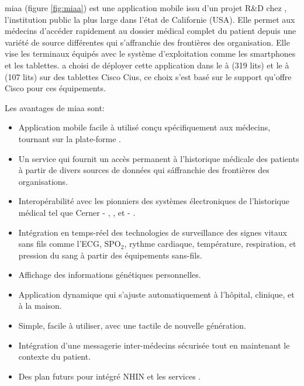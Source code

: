 \gls{miaa} (figure \ref{fig:miaa}) est une application mobile issu d'un
projet R\&D chez , l'institution public la
plus large dans l'état de Californie (USA). Elle permet aux médecins
d'accéder rapidement au dossier médical complet du patient depuis une
variété de source différentes qui s'affranchie des frontières des
organisation\cite{pph:eweek}. Elle vise les terminaux équipés avec le
système d'exploitation \android{} comme les smartphones et les
tablettes.  a choisi de déployer cette
application dans le  à  (319
lits) et le  à  (107 lits) sur des
tablettes Cisco Cius\cite{pph:tabtimes}, ce choix s'est basé sur le
support qu'offre Cisco pour ces équipements.

Les avantages de \gls{miaa} sont:~\cite{pph:yahoo}

\begin{itemize}

\item Application mobile facile à utilisé conçu spécifiquement aux
médecins, tournant sur la plate-forme \android{}.

\item Un service  qui fournit un accès permanent à
l'historique médicale des patients à partir de divers sources de
données qui s\'affranchie des frontières des organisations.

\item Interopérabilité avec les pionniers des systèmes électroniques
de l'historique médical tel que Cerner - ,
, et  - .

\item Intégration en temps-réel des technologies de surveillance
des signes vitaux sans fils comme l'ECG, SPO$_{2}$, rythme cardiaque,
température, respiration, et pression du sang à partir des équipements
sans-fils.

\item Affichage des informations génétiques personnelles.

\item Application dynamique qui s’ajuste automatiquement à l’hôpital, clinique, et à la maison.

\item Simple, facile à utiliser, avec une tactile de nouvelle génération.

\item Intégration d’une messagerie inter-médecins sécurisée tout en maintenant le contexte du patient.

\item Des plan futurs pour intégré NHIN  et les services
.

\end{itemize}

